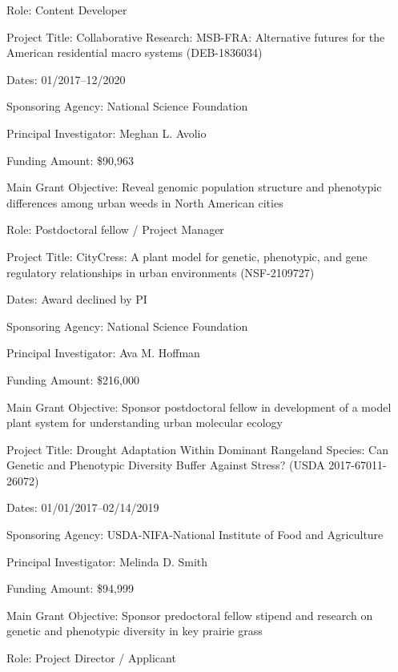 \documentclass{cv}
\begin{document}
Role: Content Developer

\vspace{5mm}

Project Title: Collaborative Research: MSB-FRA: Alternative futures for the American residential macro systems (DEB-1836034)

Dates: 01/2017--12/2020

Sponsoring Agency: National Science Foundation

Principal Investigator: Meghan L. Avolio

Funding Amount: \$90,963

Main Grant Objective: Reveal genomic population structure and phenotypic differences among urban weeds in North American cities

Role: Postdoctoral fellow / Project Manager

\vspace{5mm}

Project Title: CityCress: A plant model for genetic, phenotypic, and gene regulatory relationships in urban environments (NSF-2109727)

Dates: Award declined by PI

Sponsoring Agency: National Science Foundation

Principal Investigator: Ava M. Hoffman

Funding Amount: \$216,000

Main Grant Objective: Sponsor postdoctoral fellow in development of a model plant system for understanding urban molecular ecology

\vspace{5mm}

Project Title: Drought Adaptation Within Dominant Rangeland Species: Can Genetic and Phenotypic Diversity Buffer Against Stress? (USDA 2017-67011-26072)

Dates: 01/01/2017--02/14/2019

Sponsoring Agency: USDA-NIFA-National Institute of Food and Agriculture

Principal Investigator: Melinda D. Smith

Funding Amount: \$94,999

Main Grant Objective: Sponsor predoctoral fellow stipend and research on genetic and phenotypic diversity in key prairie grass

Role: Project Director / Applicant

\end{document}
